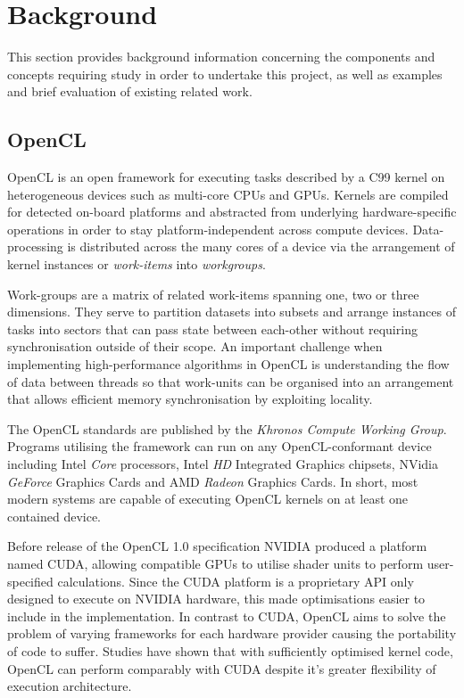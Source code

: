 \section{Background}
This section provides background information concerning the components and concepts requiring study in order to undertake this project, as well as examples and brief evaluation of existing related work.
\subsection{OpenCL}
OpenCL is an open framework for executing tasks described by a C99 kernel on heterogeneous devices such as multi-core CPUs and GPUs. Kernels are compiled for detected on-board platforms and abstracted from underlying hardware-specific operations in order to stay platform-independent across compute devices. Data-processing is distributed across the many cores of a device via the arrangement of kernel instances or \emph{work-items} into \emph{workgroups}.

Work-groups are a matrix of related work-items spanning one, two or three dimensions. They serve to partition datasets into subsets and arrange instances of tasks into sectors that can pass state between each-other without requiring synchronisation outside of their scope. An important challenge when implementing high-performance algorithms in OpenCL is understanding the flow of data between threads so that work-units can be organised into an arrangement that allows efficient memory synchronisation by exploiting locality.\cite{bestpractice}

The OpenCL standards are published by the \emph{Khronos Compute Working Group}\cite{khronos}.
Programs utilising the framework can run on any OpenCL-conformant device including Intel \emph{Core} processors, Intel \emph{HD} Integrated Graphics chipsets, NVidia \emph{GeForce} Graphics Cards and AMD \emph{Radeon} Graphics Cards.
In short, most modern systems are capable of executing OpenCL kernels on at least one contained device.

Before release of the OpenCL 1.0 specification NVIDIA produced a platform named \ac{CUDA}, allowing compatible GPUs to utilise shader units to perform user-specified calculations. Since the CUDA platform is a proprietary API only designed to execute on NVIDIA hardware, this made optimisations easier to include in the implementation. In contrast to CUDA, OpenCL aims to solve the problem of varying frameworks for each hardware provider causing the portability of code to suffer. Studies have shown that with sufficiently optimised kernel code, OpenCL can perform comparably with CUDA despite it's greater flexibility of execution architecture\cite{perf}.
